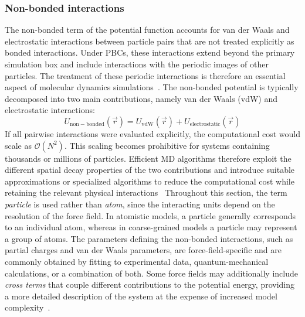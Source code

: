\subsubsection{Non-bonded interactions}
The non-bonded term of the potential function accounts for van der Waals and electrostatic interactions between particle pairs that are not treated explicitly as bonded interactions. Under PBCs, these interactions extend beyond the primary simulation box and include interactions with the periodic images of other particles. The treatment of these periodic interactions is therefore an essential aspect of molecular dynamics simulations~\cite{braun2018best}.
The non-bonded potential is typically decomposed into two main contributions, namely van der Waals (vdW) and electrostatic interactions:
\begin{equation}
U_{\mathrm{non-bonded}}(\vec{r}) =
U_{\mathrm{vdW}}(\vec{r}) +
U_{\mathrm{electrostatic}}(\vec{r})
\end{equation}
If all pairwise interactions were evaluated explicitly, the computational cost would scale as $\mathcal{O}(N^2)$. This scaling becomes prohibitive for systems containing thousands or millions of particles. Efficient MD algorithms therefore exploit the different spatial decay properties of the two contributions and introduce suitable approximations or specialized algorithms to reduce the computational cost while retaining the relevant physical interactions~\cite{braun2018best,Gromacs2015,Frenkel2023}
Throughout this section, the term \textit{particle} is used rather than \textit{atom}, since the interacting units depend on the resolution of the force field. In atomistic models, a particle generally corresponds to an individual atom, whereas in coarse-grained models a particle may represent a group of atoms. The parameters defining the non-bonded interactions, such as partial charges and van der Waals parameters, are force-field-specific and are commonly obtained by fitting to experimental data, quantum-mechanical calculations, or a combination of both. Some force fields may additionally include \textit{cross terms} that couple different contributions to the potential energy, providing a more detailed description of the system at the expense of increased model complexity~\cite{cross_term}.



